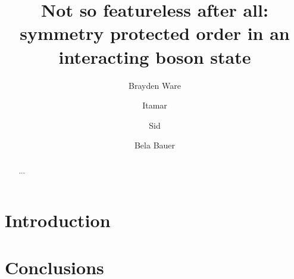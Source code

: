 \documentclass[twocolumn,english,prb,showpacs]{revtex4-1}
\begin{document}
\title{Not so featureless after all: symmetry protected order in an interacting boson state}

\author{Brayden Ware}

\author{Itamar}
\author{Sid}

\author{Bela Bauer}

\begin{abstract}
...
\end{abstract}
\maketitle

\section{Introduction}


\section{Conclusions}

\acknowledgements



\end{document}

